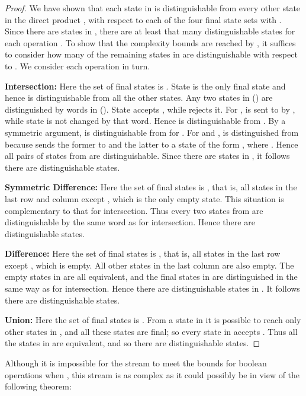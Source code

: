 \documentclass[final]{dmtcs-episciences}
\newcommand{\noin}{\noindent}
\theoremstyle{definition}
\theoremstyle{remark}
\begin{document}
\begin{proof}
We have shown that each state in  is distinguishable from every other state in the direct product , with respect to each of the four final state sets  with .
Since there are  states in ,  there are at least that many distinguishable states for each operation .
To show that the complexity bounds are reached by , it suffices to consider how many of the remaining  states in  are distinguishable with respect to .
We consider each operation in turn.

\noin\textbf{Intersection:}
Here the set of final states is .
State  is the only final state and hence is distinguishable from all the other states.
Any two states in  () are distinguished by words in  ().
State  accepts , while  rejects it.
For ,  is sent to  by , while 
state  is not changed by that word.
Hence  is distinguishable from .
By a symmetric argument,  is distinguishable from  for .
For  and ,  is distinguished from
 because  sends the former to  and the latter to a state of the form , where .
Hence all pairs of states from  are distinguishable. 
Since there are  states in ,  it follows there are  distinguishable states.

\noin\textbf{Symmetric Difference:}
Here the set of final states is , that is, all states in the last row and column except , which is the only empty state.
This situation is complementary to that for intersection. Thus every two states from  are distinguishable by the same word as for intersection.
Hence there are  distinguishable states.

\noin\textbf{Difference:}
Here the set of final states is , that is, all states in the last row  except , which is empty. All other states in the last column  are also empty. 
The  empty states in  are all equivalent, and the  final states in  are distinguished in the same way as for intersection. Hence there are  distinguishable states in . It follows there are  distinguishable states.

\noin\textbf{Union:}
Here the set of final states is . From a state in  it is possible to reach only other states in , and all these states are final; so every state in  accepts . Thus all the states in  are equivalent, and so there are  distinguishable states.
\end{proof}

Although it is impossible for the stream  to meet the bounds for boolean operations when , this stream is as complex as it could possibly be
in view of the following theorem:
\end{document}
